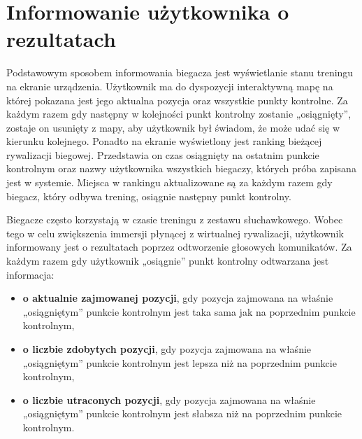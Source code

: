 \section{Informowanie użytkownika o rezultatach}
Podstawowym sposobem informowania biegacza jest wyświetlanie stanu treningu na ekranie urządzenia. Użytkownik ma do dyspozycji interaktywną mapę na której pokazana jest jego aktualna pozycja oraz wszystkie punkty kontrolne. Za każdym razem gdy następny w kolejności punkt kontrolny zostanie „osiągnięty”, zostaje on usunięty z mapy, aby użytkownik był świadom, że może udać się w kierunku kolejnego. Ponadto na ekranie wyświetlony jest ranking bieżącej rywalizacji biegowej. Przedstawia on czas osiągnięty na ostatnim punkcie kontrolnym oraz nazwy użytkownika wszystkich biegaczy, których próba zapisana jest w systemie. Miejsca w rankingu aktualizowane są za każdym razem gdy biegacz, który odbywa trening, osiągnie następny punkt kontrolny.

Biegacze często korzystają w czasie treningu z zestawu słuchawkowego. Wobec tego w celu zwiększenia immersji płynącej z wirtualnej rywalizacji, użytkownik informowany jest o rezultatach poprzez odtworzenie głosowych komunikatów. Za każdym razem gdy użytkownik „osiągnie” punkt kontrolny odtwarzana jest informacja:
\begin{itemize}
\item{\textbf{o aktualnie zajmowanej pozycji}, gdy pozycja zajmowana na właśnie „osiągniętym” punkcie kontrolnym jest taka sama jak na poprzednim punkcie kontrolnym},
\item{\textbf{o liczbie zdobytych pozycji}, gdy pozycja zajmowana na właśnie „osiągniętym” punkcie kontrolnym jest lepsza niż na poprzednim punkcie kontrolnym},
\item{\textbf{o liczbie utraconych pozycji}, gdy pozycja zajmowana na właśnie „osiągniętym” punkcie kontrolnym jest słabsza niż na poprzednim punkcie kontrolnym}.
\end{itemize}